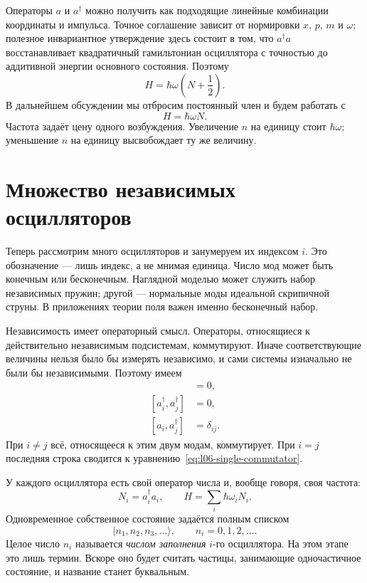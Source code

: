 Операторы \(a\) и \(a^\dagger\) можно получить как подходящие линейные комбинации координаты и импульса. Точное соглашение зависит от нормировки \(x\), \(p\), \(m\) и \(\omega\); полезное инвариантное утверждение здесь состоит в том, что \(a^\dagger a\) восстанавливает квадратичный гамильтониан осциллятора с точностью до аддитивной энергии основного состояния. Поэтому
\begin{equation}
H=\hbar\omega\left(N+\frac12\right).
\end{equation}
В дальнейшем обсуждении мы отбросим постоянный член и будем работать с
\begin{equation}
H=\hbar\omega N.
\label{eq:l06-one-oscillator-hamiltonian}
\end{equation}
Частота задаёт цену одного возбуждения. Увеличение \(n\) на единицу стоит \(\hbar\omega\); уменьшение \(n\) на единицу высвобождает ту же величину.

\section{Множество независимых осцилляторов}

Теперь рассмотрим много осцилляторов и занумеруем их индексом \(i\). Это обозначение — лишь индекс, а не мнимая единица. Число мод может быть конечным или бесконечным. Наглядной моделью может служить набор независимых пружин; другой — нормальные моды идеальной скрипичной струны. В приложениях теории поля важен именно бесконечный набор.

Независимость имеет операторный смысл. Операторы, относящиеся к действительно независимым подсистемам, коммутируют. Иначе соответствующие величины нельзя было бы измерять независимо, и сами системы изначально не были бы независимыми. Поэтому имеем
\begin{align}
[a_i,a_j]&=0, \\
[a_i^\dagger,a_j^\dagger]&=0, \\
[a_i,a_j^\dagger]&=\delta_{ij}.
\label{eq:l06-many-commutators}
\end{align}
При \(i\ne j\) всё, относящееся к этим двум модам, коммутирует. При \(i=j\) последняя строка сводится к уравнению~\eqref{eq:l06-single-commutator}.

У каждого осциллятора есть свой оператор числа и, вообще говоря, своя частота:
\begin{equation}
N_i=a_i^\dagger a_i,
\qquad
H=\sum_i\hbar\omega_i N_i.
\label{eq:l06-many-hamiltonian}
\end{equation}
Одновременное собственное состояние задаётся полным списком
\begin{equation}
|n_1,n_2,n_3,\ldots\rangle,
\qquad n_i=0,1,2,\ldots.
\label{eq:l06-occupation-ket}
\end{equation}
Целое число \(n_i\) называется \emph{числом заполнения} \(i\)-го осциллятора. На этом этапе это лишь термин. Вскоре оно будет считать частицы, занимающие одночастичное состояние, и название станет буквальным.

